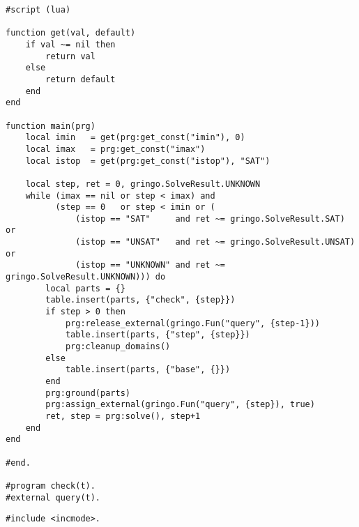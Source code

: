 \begin{lstlisting}[caption={\lstinline{gringo/examples/clingo/iclingo/incmode-lua.lp}}]
#script (lua) 

function get(val, default)
    if val ~= nil then 
        return val 
    else 
        return default 
    end
end

function main(prg)
    local imin   = get(prg:get_const("imin"), 0)
    local imax   = prg:get_const("imax")
    local istop  = get(prg:get_const("istop"), "SAT")

    local step, ret = 0, gringo.SolveResult.UNKNOWN
    while (imax == nil or step < imax) and
          (step == 0   or step < imin or (
              (istop == "SAT"     and ret ~= gringo.SolveResult.SAT) or
              (istop == "UNSAT"   and ret ~= gringo.SolveResult.UNSAT) or 
              (istop == "UNKNOWN" and ret ~= gringo.SolveResult.UNKNOWN))) do
        local parts = {}
        table.insert(parts, {"check", {step}})
        if step > 0 then
            prg:release_external(gringo.Fun("query", {step-1}))
            table.insert(parts, {"step", {step}})
            prg:cleanup_domains()
        else
            table.insert(parts, {"base", {}})
        end
        prg:ground(parts)
        prg:assign_external(gringo.Fun("query", {step}), true)
        ret, step = prg:solve(), step+1
    end
end

#end.

#program check(t).
#external query(t).
\end{lstlisting}

\begin{lstlisting}
#include <incmode>.
\end{lstlisting}


